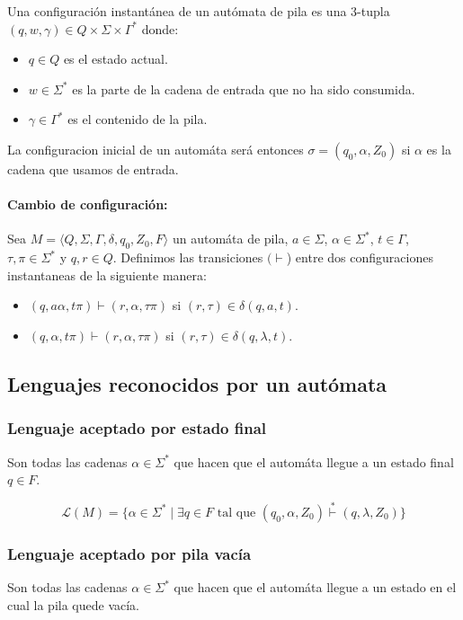 Una configuración instantánea de un autómata de pila es una 3-tupla $(q, w, \gamma) \in Q\times\Sigma\times\Gamma^*$ donde:
\begin{itemize}
  \item $q \in Q$ es el estado actual.
  \item $w \in \Sigma^*$ es la parte de la cadena de entrada que no ha sido consumida.
  \item $\gamma \in \Gamma^*$ es el contenido de la pila.
\end{itemize}

La configuracion inicial de un automáta será entonces $\sigma = (q_0, \alpha, Z_0)$ si \(\alpha\) es la cadena que usamos de entrada.

\paragraph{Cambio de configuración:} Sea $M=\langle Q, \Sigma, \Gamma, \delta, q_0, Z_0, F \rangle$ un automáta de pila, \(a\in\Sigma\), \(\alpha\in\Sigma^*\), \(t\in\Gamma\), \(\tau,\pi\in\Sigma^*\) y \(q,r\in Q\). Definimos las transiciones \((\vdash\)) entre dos configuraciones instantaneas de la siguiente manera:
\begin{itemize}
  \item \((q, a\alpha, t\pi)\vdash (r, \alpha, \tau\pi)\) si \((r,\tau)\in\delta(q,a,t)\).
  \item \((q,   \alpha, t\pi)\vdash (r, \alpha, \tau\pi)\) si \((r,\tau)\in\delta(q,\lambda,t)\).
\end{itemize}

\subsection{Lenguajes reconocidos por un autómata}
\subsubsection{Lenguaje aceptado por estado final}
Son todas las cadenas \(\alpha\in\Sigma^*\) que hacen que el automáta llegue a un estado final \(q\in F\).

\[ \mathcal{L}(M) = \{ \alpha \in \Sigma^* \mid \exists q \in F \text{ tal que } (q_0, \alpha, Z_0) \overset{*}{\vdash}  (q, \lambda, Z_0) \} \]

\subsubsection{Lenguaje aceptado por pila vacía}
Son todas las cadenas \(\alpha\in\Sigma^*\) que hacen que el automáta llegue a un estado en el cual la pila quede vacía.

